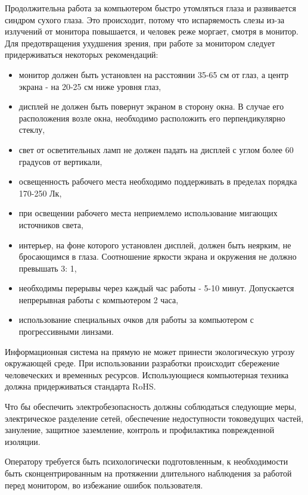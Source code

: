 Продолжительна работа за компьютером быстро утомляться глаза и развивается синдром сухого глаза. Это происходит, потому что испаряемость слезы из-за излучений от монитора повышается, и человек реже моргает, смотря в монитор.
Для предотвращения ухудшения зрения, при работе за монитором следует придерживаться некоторых рекомендаций: 
\begin{itemize}
    \item монитор должен быть установлен на расстоянии 35-65 см от глаз, а
    центр экрана - на 20-25 см ниже уровня глаз,
    \item дисплей не должен быть повернут экраном в сторону окна. В случае
его расположения возле окна, необходимо расположить его перпендикулярно
стеклу,
    \item свет от осветительных ламп не должен падать на дисплей с углом
более 60 градусов от вертикали,
    \item освещенность рабочего места необходимо поддерживать в пределах
порядка 170-250 Лк,
    \item при освещении рабочего места неприемлемо использование
мигающих источников света,
    \item интерьер, на фоне которого установлен дисплей, должен быть
неярким, не бросающимся в глаза. Соотношение яркости экрана и окружения
не должно превышать 3: 1,
    \item необходимы перерывы через каждый час работы - 5-10 минут. Допускается непрерывная работы с компьютером 2 часа,
    \item использование специальных очков для работы за компьютером с прогрессивными линзами.
\end{itemize}


Информационная система на прямую не может принести экологическую угрозу окружающей среде. При использовании разработки происходит сбережение человеческих и временных ресурсов. 
Использующиеся компьютерная техника должна придерживаться стандарта RoHS.  

Что бы обеспечить электробезопасность должны соблюдаться следующие меры, электрическое разделение сетей, обеспечение недоступности токоведущих частей, зануление, защитное заземление, контроль и профилактика поврежденной изоляции.

Оператору требуется быть психологически подготовленным, к необходимости быть сконцентрированным на протяжении длительного наблюдения за работой перед монитором, во избежание ошибок пользователя.  

\pagebreak